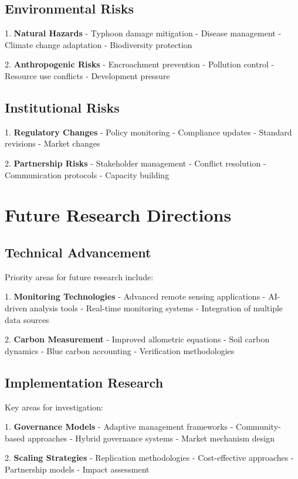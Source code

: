 \documentclass{article}
\theoremstyle{plain}
\theoremstyle{definition}
\theoremstyle{remark}
\begin{document}
\begin{multicols}{2}
\subsection{Environmental Risks}

1. \textbf{Natural Hazards}
   - Typhoon damage mitigation
   - Disease management
   - Climate change adaptation
   - Biodiversity protection

2. \textbf{Anthropogenic Risks}
   - Encroachment prevention
   - Pollution control
   - Resource use conflicts
   - Development pressure

\subsection{Institutional Risks}

1. \textbf{Regulatory Changes}
   - Policy monitoring
   - Compliance updates
   - Standard revisions
   - Market changes

2. \textbf{Partnership Risks}
   - Stakeholder management
   - Conflict resolution
   - Communication protocols
   - Capacity building

\section{Future Research Directions}

\subsection{Technical Advancement}
Priority areas for future research include:

1. \textbf{Monitoring Technologies}
   - Advanced remote sensing applications
   - AI-driven analysis tools
   - Real-time monitoring systems
   - Integration of multiple data sources

2. \textbf{Carbon Measurement}
   - Improved allometric equations
   - Soil carbon dynamics
   - Blue carbon accounting
   - Verification methodologies

\subsection{Implementation Research}
Key areas for investigation:

1. \textbf{Governance Models}
   - Adaptive management frameworks
   - Community-based approaches
   - Hybrid governance systems
   - Market mechanism design

2. \textbf{Scaling Strategies}
   - Replication methodologies
   - Cost-effective approaches
   - Partnership models
   - Impact assessment


\end{multicols}
\end{document}
